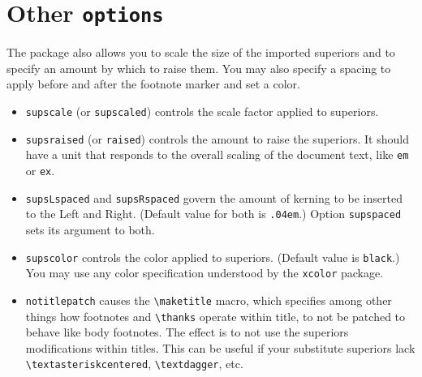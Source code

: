 \documentclass[11pt]{article}
\begin{document}
\section*{Other {\tt options}}
 The package also allows you to scale the size of the imported superiors  and to specify an amount by which to raise them. You may also specify a spacing to apply before and after the footnote marker and set a color.
 \begin{itemize}
\item
 {\tt supscale} (or {\tt supscaled}) controls the scale factor applied to superiors. 
 \item
 {\tt supsraised} (or {\tt raised}) controls the amount to raise the superiors. It should have a unit that responds to the overall scaling of the document text, like {\tt em} or {\tt ex}.
\item
{\tt supsLspaced} and {\tt supsRspaced} govern the amount of kerning to be inserted to the Left and Right. (Default value for both is {\tt .04em}.) Option {\tt supspaced} sets its argument to both.
\item
 {\tt supscolor} controls the color applied to superiors. (Default value is {\tt black}.) You may use any color specification understood by the {\tt xcolor} package.
\item
{\tt notitlepatch} causes the \verb|\maketitle| macro, which specifies among other things how footnotes and \verb|\thanks| operate within title, to not be patched to behave like body footnotes. The effect is to not use the superiors modifications within titles. This can be useful if your substitute superiors lack \verb|\textasteriskcentered|, \verb|\textdagger|, etc.
\end{itemize}
\end{document}
